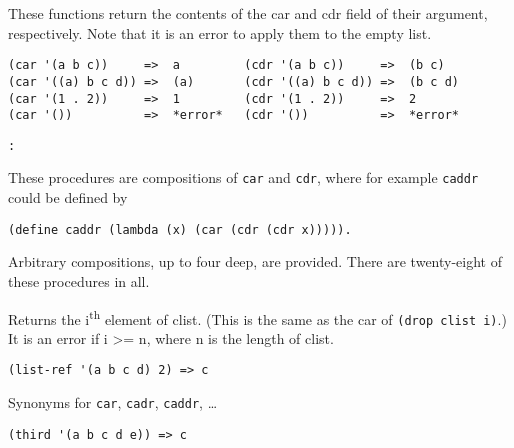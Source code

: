 \begin{entry}{%
    }

  These functions
  return the contents of the car and cdr field of their argument,
  respectively. Note that it is an error to apply them to the empty
  list.

\begin{verbatim}
(car '(a b c))     =>  a         (cdr '(a b c))     =>  (b c)  
(car '((a) b c d)) =>  (a)       (cdr '((a) b c d)) =>  (b c d)
(car '(1 . 2))     =>  1         (cdr '(1 . 2))     =>  2      
(car '())          =>  *error*   (cdr '())          =>  *error*
\end{verbatim}
\end{entry}
   
\begin{entry}{%
  \texttt{:}\\
  }

  These
  procedures are compositions of \texttt{car} and \texttt{cdr}, where
  for example \texttt{caddr} could be defined by

\begin{verbatim}
(define caddr (lambda (x) (car (cdr (cdr x))))).
\end{verbatim}

  Arbitrary compositions, up to four deep, are provided. There are
  twenty-eight of these procedures in all.
\end{entry}

\begin{entry}{%
  }

  Returns the i\textsuperscript{th} element of clist. (This is the
  same as the car of \texttt{(drop\ clist\ i)}.) It is an error if i
  \textgreater{}= n, where n is the length of clist.

\begin{verbatim}
(list-ref '(a b c d) 2) => c
\end{verbatim}
\end{entry}

\begin{entry}{%
  }

 Synonyms for
  \texttt{car}, \texttt{cadr}, \texttt{caddr}, \ldots{}

\begin{verbatim}
(third '(a b c d e)) => c
\end{verbatim}
\end{entry}

